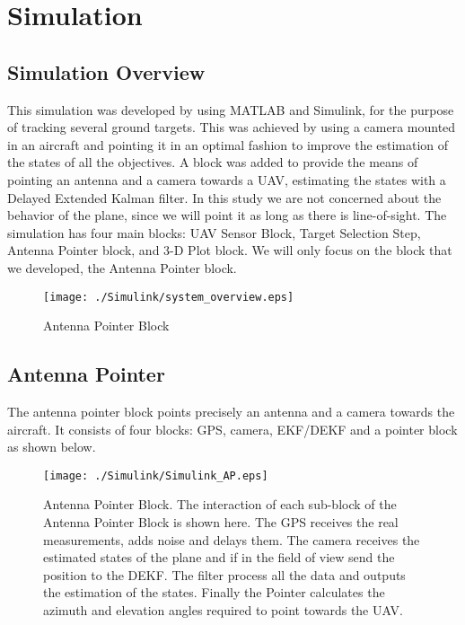 \chapter{Simulation}
\label{ch:simulation}

\section{Simulation Overview}
This simulation was developed by \cite{Sharma2013} using MATLAB and Simulink, for the purpose of tracking several ground targets. This was achieved by using a camera mounted in an aircraft and pointing it in an optimal fashion to improve the estimation of the states of all the objectives. A block was added to provide the means of pointing an antenna and a camera towards a UAV, estimating the states with a Delayed Extended Kalman filter. In this study we are not concerned about the behavior of the plane, since we will point it as long as there is line-of-sight. The simulation has four main blocks: UAV Sensor Block, Target Selection Step, Antenna Pointer block, and 3-D Plot block. We will only focus on the block that we developed, the Antenna Pointer block.

\begin{figure}[h!]
  \texttt{[image: ./Simulink/system\_overview.eps]}
  \label{fig:system_overview}
  \caption[Antenna Pointer Block]{Antenna Pointer Block}
\end{figure}


\section{Antenna Pointer}
The antenna pointer block points precisely an antenna and a camera towards the aircraft. It consists of four blocks: GPS, camera, EKF/DEKF and a pointer block as shown below.
 
\begin{figure}[h!]
  \texttt{[image: ./Simulink/Simulink\_AP.eps]}
  \label{fig:AP}
  \caption[Antenna Pointer Block]{Antenna Pointer Block. The interaction of each sub-block of the Antenna Pointer Block is shown here. The GPS receives the real measurements, adds noise and delays them. The camera receives the estimated states of the plane and if in the field of view send the position to the DEKF. The filter process all the data and outputs the estimation of the states. Finally the Pointer calculates the azimuth and elevation angles required to point towards the UAV.}
\end{figure}

